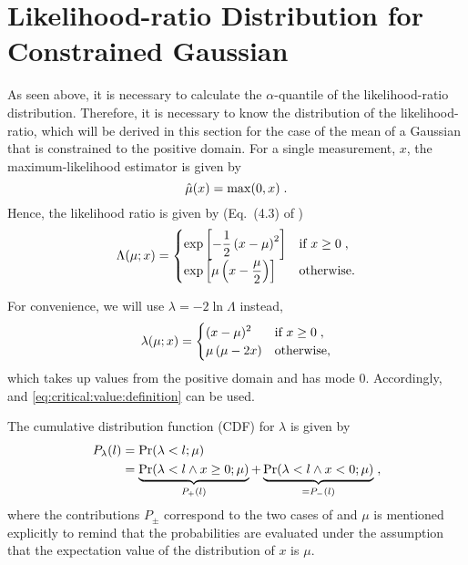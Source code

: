 \documentclass[a4paper]{article}
\newcommand*\Prob{\mathrm{Pr}}
\begin{document}
\section{Likelihood-ratio Distribution for Constrained Gaussian}

As seen above, it is necessary to calculate the $\alpha$-quantile of the
likelihood-ratio distribution. Therefore, it is necessary to know the
distribution of the likelihood-ratio, which will be derived in this
section for the case of the mean of a Gaussian that is constrained to
the positive domain. For a single measurement, $x$, the
maximum-likelihood estimator is given by\cite{Feldman1998}
%
\begin{equation*}
  \hat\mu(x) = \max(0, x)
  \;.
\end{equation*}
%
Hence, the likelihood ratio is given by (Eq.~(4.3) of
\cite{Feldman1998})
%
\begin{equation*}
  \Lambda(\mu; x) = 
  \begin{cases}
    \displaystyle
    \exp\left[ - \frac{1}{2} \left( x - \mu \right)^2 \right] & \text{if } x \geq 0
    \;,
    \\
    \displaystyle
    \exp\left[ \mu \left( x - \frac{\mu}{2} \right) \right] &
    \text{otherwise.}
  \end{cases}
\end{equation*}
%

For convenience, we will use $\lambda=-2\ln\Lambda$ instead,
%
\begin{equation}
  \label{eq:log:likelihood:ratio}
  \lambda(\mu; x) = 
  \begin{cases}
    \displaystyle
     (x-\mu)^2 & \text{if } x \geq 0
    \;,
    \\
    \displaystyle
    \mu \left( \mu - 2x \right) & \text{otherwise,}
  \end{cases}
\end{equation}
%
which takes up values from the positive domain and has mode 0.
Accordingly,  and
\eqref{eq:critical:value:definition} can be used.

The cumulative distribution function (CDF) for $\lambda$ is given by
\begin{align*}
  P_\lambda(l) & = \Prob(\lambda < l; \mu) \\
  & =
  \underbrace{\Prob(\lambda < l \wedge x \geq 0; \mu)}_{P_+(l)}
  +
  \underbrace{\Prob(\lambda < l \wedge x < 0; \mu)}_{=P_-(l)}
  \fcomma
\end{align*}
where the contributions $P_\pm$ correspond to the two cases of
 and $\mu$ is mentioned explicitly to
remind that the probabilities are evaluated under the assumption that
the expectation value of the distribution of $x$ is $\mu$.
\end{document}
